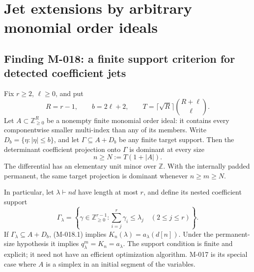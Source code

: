 \section{Jet extensions by arbitrary monomial order ideals}

\subsection*{Finding M-018: a finite support criterion for detected coefficient jets}
Fix \(r\geq2\), \(\ell\geq0\), and put
\[
 R=r-1,\qquad b=2\ell+2,\qquad
 T=\lceil\sqrt R\rceil\binom{R+\ell}{\ell}.
\]
Let \(A\subset\mathbb Z_{\geq0}^R\) be a nonempty finite
monomial order ideal: it contains every componentwise smaller
multi-index than any of its members. Write
\(D_b=\{\eta:|\eta|\leq b\}\), and let
\(\Gamma\subseteq A+D_b\) be any finite target support.
Then the determinant coefficient projection onto \(\Gamma\)
is dominant at every size
\[
                         n\geq N:=T(1+|A|).                 \tag{M-018.1}
\]
The differential has an elementary unit minor over \(\mathbb Z\).
With the internally padded permanent, the same target projection
is dominant whenever \(n\geq m\geq N\).

In particular, let \(\lambda\vdash nd\) have length at most \(r\),
and define its nested coefficient support
\[
 \Gamma_\lambda=\left\{\gamma\in\mathbb Z_{\geq0}^{r-1}:
       \sum_{i=j}^r\gamma_i\leq\lambda_j\quad(2\leq j\leq r)
                   \right\}.
                                                               \tag{M-018.2}
\]
If \(\Gamma_\lambda\subseteq A+D_b\), (M-018.1) implies
\(K_n(\lambda)=a_\lambda(d[n])\). Under the permanent-size
hypothesis it implies \(q^m_\lambda=K_n=a_\lambda\).
The support condition is finite and explicit; it need not have
an efficient optimization algorithm. M-017 is its special case
where \(A\) is a simplex in an initial segment of the variables.

